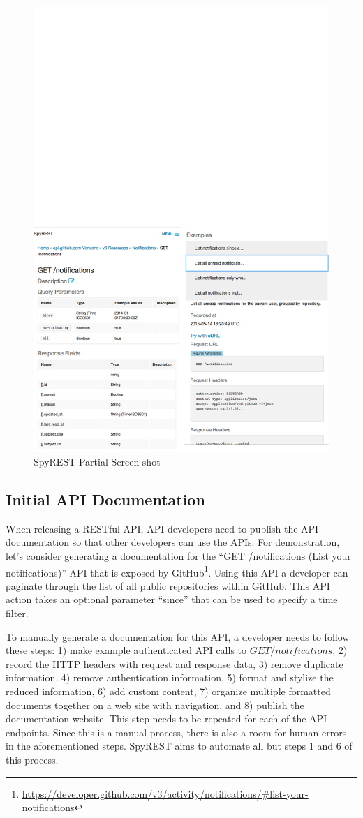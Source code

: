 \documentclass[conference]{IEEEtran}
\begin{document}
\begin{figure}[tbh]
  \centering
  \includegraphics[width=0.8 \linewidth]{notifications.png}
  \caption{SpyREST Partial Screen shot}
  \label{fig:screenshot}
\end{figure}

\subsection{Initial API Documentation} %
When releasing a RESTful API, API developers need to publish the API documentation so that other developers can use the APIs. For demonstration, let's consider generating a documentation for the ``GET /notifications (List your notifications)'' API that is exposed by GitHub\footnote{\url{https://developer.github.com/v3/activity/notifications/#list-your-notifications}}. Using this API a developer can paginate through the list of all public repositories within GitHub. This API action takes an optional parameter ``since'' that can be used to specify a time filter.

To manually generate a documentation for this API, a developer needs to follow these steps: 1) make example authenticated API calls to $GET /notifications$, 2) record the HTTP headers with request and response data, 3) remove duplicate information, 4) remove authentication information, 5) format and stylize the reduced information, 6) add custom content, 7) organize multiple formatted documents together on a web site with navigation, and 8) publish the documentation website. This step needs to be repeated for each of the API endpoints. Since this is a manual process, there is also a room for human errors in the aforementioned steps. SpyREST aims to automate all but steps 1 and 6 of this process.
\end{document}
